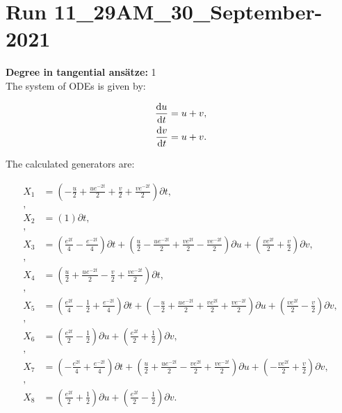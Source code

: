 \section*{Run 11\_29AM\_30\_September-2021}
\textbf{Degree in tangential ansätze:}	1\\
The system of ODEs is given by:

\begin{align*}
\dv{u}{t}&=u + v,\\
\dv{v}{t}&=u + v.\\
\end{align*}

\noindent The calculated generators are:

\begin{align*}
X_{1}&=\left( - \frac{u}{2} + \frac{u e^{- 2 t}}{2} + \frac{v}{2} + \frac{v e^{- 2 t}}{2} \right)\partial t,\\
,\\
X_{2}&=\left( 1 \right)\partial t,\\
,\\
X_{3}&=\left( \frac{e^{2 t}}{4} - \frac{e^{- 2 t}}{4} \right)\partial t+\left( \frac{u}{2} - \frac{u e^{- 2 t}}{2} + \frac{v e^{2 t}}{2} - \frac{v e^{- 2 t}}{2} \right)\partial u+\left( \frac{v e^{2 t}}{2} + \frac{v}{2} \right)\partial v,\\
,\\
X_{4}&=\left( \frac{u}{2} + \frac{u e^{- 2 t}}{2} - \frac{v}{2} + \frac{v e^{- 2 t}}{2} \right)\partial t,\\
,\\
X_{5}&=\left( \frac{e^{2 t}}{4} - \frac{1}{2} + \frac{e^{- 2 t}}{4} \right)\partial t+\left( - \frac{u}{2} + \frac{u e^{- 2 t}}{2} + \frac{v e^{2 t}}{2} + \frac{v e^{- 2 t}}{2} \right)\partial u+\left( \frac{v e^{2 t}}{2} - \frac{v}{2} \right)\partial v,\\
,\\
X_{6}&=\left( \frac{e^{2 t}}{2} - \frac{1}{2} \right)\partial u+\left( \frac{e^{2 t}}{2} + \frac{1}{2} \right)\partial v,\\
,\\
X_{7}&=\left( - \frac{e^{2 t}}{4} + \frac{e^{- 2 t}}{4} \right)\partial t+\left( \frac{u}{2} + \frac{u e^{- 2 t}}{2} - \frac{v e^{2 t}}{2} + \frac{v e^{- 2 t}}{2} \right)\partial u+\left( - \frac{v e^{2 t}}{2} + \frac{v}{2} \right)\partial v,\\
,\\
X_{8}&=\left( \frac{e^{2 t}}{2} + \frac{1}{2} \right)\partial u+\left( \frac{e^{2 t}}{2} - \frac{1}{2} \right)\partial v.\\
\end{align*}
